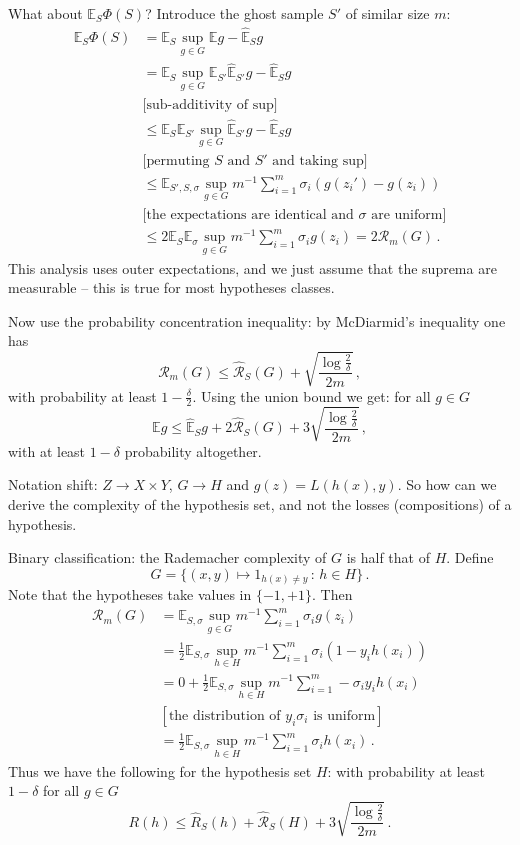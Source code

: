 \documentclass[a4paper]{article}
\newcommand{\ex}{\mathbb{E}}
\begin{document}
What about $\ex_S \Phi(S)$? Introduce the ghost sample $S'$ of similar size $m$:
\begin{align*}
    \ex_S \Phi(S)
        &= \ex_S \sup_{g\in G} \ex g - \hat{\ex}_S g \\
        &= \ex_S \sup_{g\in G} \ex_{S'} \hat{\ex}_{S'} g - \hat{\ex}_S g \\
        & \bigl[\text{sub-additivity of sup}\bigr]\\
        &\leq \ex_S \ex_{S'} \sup_{g\in G} \hat{\ex}_{S'} g - \hat{\ex}_S g \\
        & \bigl[\text{permuting } S \text{ and } S' \text{ and taking sup}\bigr] \\
        &\leq \ex_{S',S,\sigma} \sup_{g\in G} m^{-1} \sum_{i=1}^m \sigma_i(g(z_i') - g(z_i)) \\
        & \bigl[\text{the expectations are identical and } \sigma \text{ are uniform}\bigr] \\
        &\leq 2 \ex_S \ex_\sigma \sup_{g\in G} m^{-1} \sum_{i=1}^m \sigma_i g(z_i)
        = 2 \mathcal{R}_m(G) \,.
\end{align*}
This analysis uses outer expectations, and we just assume that the suprema are measurable
-- this is true for most hypotheses classes.

Now use the probability concentration inequality: by McDiarmid's inequality one
has
\[ \mathcal{R}_m(G) \leq \hat{\mathcal{R}}_S(G) + \sqrt{\frac{\log\frac{2}{\delta}}{2m}} \,, \]
with probability at least $1-\frac{\delta}{2}$. Using the union bound we get: for
all $g\in G$
\[ \ex g \leq \hat{\ex}_S g + 2 \hat{\mathcal{R}}_S(G) + 3 \sqrt{\frac{\log\frac{2}{\delta}}{2m}} \,, \]
with at least $1-\delta$ probability altogether.

Notation shift: $Z \to X\times Y$, $G \to H$ and $g(z) = L(h(x), y)$. So how can we
derive the complexity of the hypothesis set, and not the losses (compositions) of a
hypothesis.

Binary classification: the Rademacher complexity of $G$ is half that of $H$. Define
\[ G = \{(x,y)\mapsto 1_{h(x)\neq y}\,:\, h\in H\} \,. \]
Note that the hypotheses take values in $\{-1,+1\}$. Then
\begin{align}
    \mathcal{R}_m(G)
        &= \ex_{S, \sigma} \sup_{g\in G} m^{-1} \sum_{i=1}^m \sigma_i g(z_i) \\
        &= \frac{1}{2} \ex_{S, \sigma} \sup_{h\in H} m^{-1} \sum_{i=1}^m \sigma_i (1 - y_i h(x_i)) \\
        &= 0 + \frac{1}{2} \ex_{S, \sigma} \sup_{h\in H} m^{-1} \sum_{i=1}^m - \sigma_i y_i h(x_i) \\
        &[\text{the distribution of } y_i \sigma_i \text{ is uniform}]\\
        &= \frac{1}{2} \ex_{S, \sigma} \sup_{h\in H} m^{-1} \sum_{i=1}^m \sigma_i h(x_i) \,.
\end{align}
Thus we have the following for the hypothesis set $H$: with probability at least $1-\delta$
for all $g\in G$
\[ R(h) \leq \hat{R}_S(h) + \hat{\mathcal{R}}_S(H) + 3\sqrt{\frac{\log\frac{2}{\delta}}{2m}} \,.\]
\end{document}
